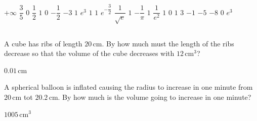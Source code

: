 \begin{Answer}\phantom{}
    \begin{multicols}{4}
		
		\Question $+\infty$ 
		\Question $\dfrac{3}{5}$  
		\Question $0$
		\Question $\dfrac{1}{2}$
		\Question $1$ 
		\Question $0$ 
		\Question $-\dfrac{1}{2}$  
		\ifcalculus
		\Question $-3$  %
		\fi
		\Question $1$ 
		\Question $e^3$ 
		\Question $1 $ 
		\Question $1 $ 
		\Question $e^{-\dfrac{3}{2}}$  
		\Question $\dfrac{1}{\sqrt{e}}$ 
		\Question $1$ 
		\ifanalysis
        \Question $-\dfrac{1}{\pi}$ 
        \Question $1$ 
        \Question $\dfrac{1}{e^2}$
        \Question $1$
        \Question $0$
        \Question $1$
        \Question $3$
        \Question $-1$
        \Question $-5$
        \Question $-8$
        \Question $0$
        \Question $e^3$
        \fi
		\EndCurrentQuestion
    \end{multicols}
\end{Answer}



\subsection*{}

\begin{Exercise}[difficulty = 2] A cube has ribs of length $20\, \mathrm{cm}$. By how much must the length of the ribs decrease so that the volume of the cube decreases with $12\, \mathrm{cm^3}$? 

\end{Exercise}

\begin{Answer}\phantom{}
    $0.01\, \mathrm{cm}$
\end{Answer}

\begin{Exercise}[difficulty = 2] A spherical balloon is inflated causing the radius to increase in one minute from $20\, \mathrm{cm}$ tot $20.2\, \mathrm{cm}$. By how much is the volume going to increase in one minute?

\end{Exercise}

\begin{Answer}\phantom{}
    $1005\, \mathrm{cm}^3$
\end{Answer}



